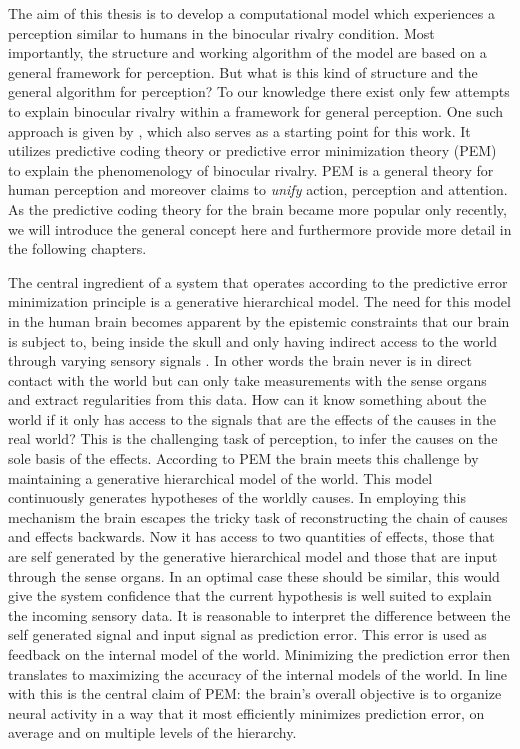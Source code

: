 \documentclass[utf8]{frontiersSCNS} %
\begin{document}
The aim of this thesis is to develop a computational model which experiences a perception similar to humans in the binocular rivalry condition. Most importantly, the structure and working algorithm of the model are based on a general framework for perception. But what is this kind of structure and the general algorithm for perception? To our knowledge there exist only few attempts to explain binocular rivalry within a framework for general perception. One such approach is given by \cite{Hohwy2008}, which also serves as a starting point for this work. It utilizes predictive coding theory or predictive error minimization theory (PEM) to explain the phenomenology of binocular rivalry. PEM is a general theory for human perception and moreover claims to \textit{unify} action, perception and attention. As the predictive coding theory for the brain became more popular only recently, we will introduce the general concept here and furthermore provide more detail in the following chapters. 

The central ingredient of a system that operates according to the predictive error minimization principle is a generative hierarchical model. The need for this model in the human brain becomes apparent by the epistemic constraints that our brain is subject to, being inside the skull and only having indirect access to the world through varying sensory signals \cite{Clark2013a}. In other words the brain never is in direct contact with the world but can only take measurements with the sense organs and extract regularities from this data. How can it know something about the world if it only has access to the signals that are the effects of the causes in the real world?
    This is the challenging task of perception, to infer the causes on the sole basis of the effects.
    According to PEM the brain meets this challenge by maintaining a generative hierarchical model of the world. This model continuously generates hypotheses of the worldly causes.
    In employing this mechanism the brain escapes the tricky task of reconstructing the chain of causes and effects backwards. Now it has access to two quantities of effects, those that are self generated by the generative hierarchical model and those that are input through the sense organs. In an optimal case these should be similar, this would give the system confidence that the current hypothesis is well suited to explain the incoming sensory data. It is reasonable to interpret the difference between the self generated signal and input signal as prediction error. This error is used as feedback on the internal model of the world. Minimizing the prediction error then translates to maximizing the accuracy of the internal models of the world. In line with this is the central claim of PEM: the brain's overall objective is to organize neural activity in a way that it most efficiently minimizes prediction error, on average and on multiple levels of the hierarchy. \cite{Hohwy2013} 
\end{document}
